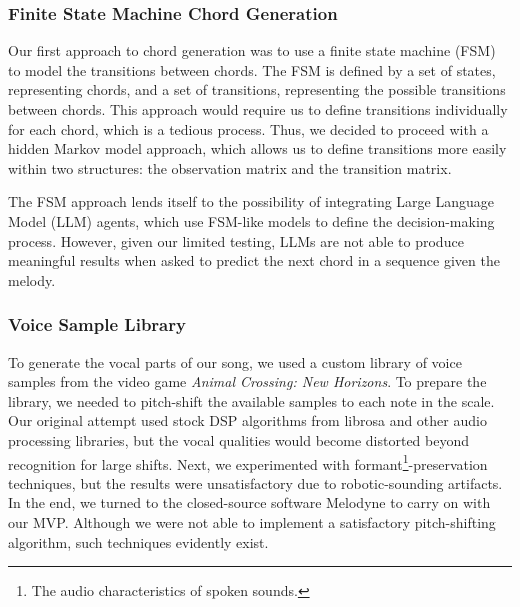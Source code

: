 \subsubsection{Finite State Machine Chord Generation}

Our first approach to chord generation was to use a finite state machine (FSM) to model the transitions between chords. The FSM is defined by a set of states, representing chords, and a set of transitions, representing the possible transitions between chords. This approach would require us to define transitions individually for each chord, which is a tedious process. Thus, we decided to proceed with a hidden Markov model approach, which allows us to define transitions more easily within two structures: the observation matrix and the transition matrix.

The FSM approach lends itself to the possibility of integrating Large Language Model (LLM) agents, which use FSM-like models to define the decision-making process. However, given our limited testing, LLMs are not able to produce meaningful results when asked to predict the next chord in a sequence given the melody.

\subsubsection{Voice Sample Library}

To generate the vocal parts of our song, we used a custom library of voice samples from the video game \emph{Animal Crossing: New Horizons}. To prepare the library, we needed to pitch-shift the available samples to each note in the scale. Our original attempt used stock DSP algorithms from librosa and other audio processing libraries, but the vocal qualities would become distorted beyond recognition for large shifts. Next, we experimented with formant\footnote{The audio characteristics of spoken sounds.}-preservation techniques, but the results were unsatisfactory due to robotic-sounding artifacts. In the end, we turned to the closed-source software Melodyne to carry on with our MVP. Although we were not able to implement a satisfactory pitch-shifting algorithm, such techniques evidently exist.
